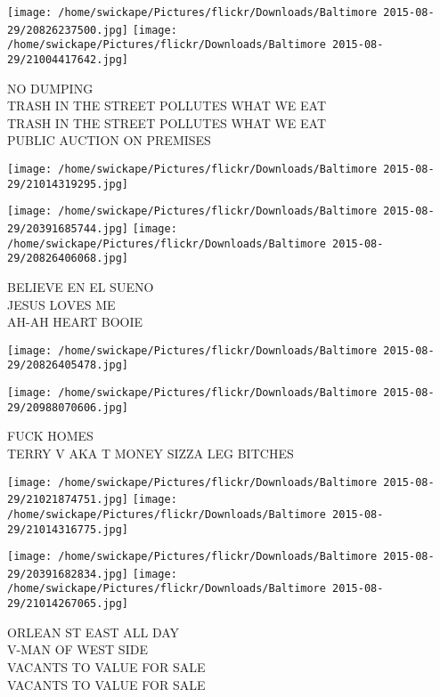 \documentclass[10pt,letterpaper]{article}
\begin{document}
\texttt{[image: /home/swickape/Pictures/flickr/Downloads/Baltimore 2015-08-29/20826237500.jpg]}
\texttt{[image: /home/swickape/Pictures/flickr/Downloads/Baltimore 2015-08-29/21004417642.jpg]}

NO DUMPING\\
TRASH IN THE STREET POLLUTES WHAT WE EAT\\
TRASH IN THE STREET POLLUTES WHAT WE EAT\\
PUBLIC AUCTION ON PREMISES\\
\pagebreak

\texttt{[image: /home/swickape/Pictures/flickr/Downloads/Baltimore 2015-08-29/21014319295.jpg]}

\vspace{0.25in}
\texttt{[image: /home/swickape/Pictures/flickr/Downloads/Baltimore 2015-08-29/20391685744.jpg]}
\texttt{[image: /home/swickape/Pictures/flickr/Downloads/Baltimore 2015-08-29/20826406068.jpg]}

BELIEVE EN EL SUENO\\
JESUS LOVES ME\\
AH{-}AH HEART BOOIE\\
\pagebreak

\texttt{[image: /home/swickape/Pictures/flickr/Downloads/Baltimore 2015-08-29/20826405478.jpg]}

\vspace{0.25in}
\texttt{[image: /home/swickape/Pictures/flickr/Downloads/Baltimore 2015-08-29/20988070606.jpg]}

FUCK HOMES\\
TERRY V AKA T MONEY SIZZA LEG BITCHES\\
\pagebreak

\texttt{[image: /home/swickape/Pictures/flickr/Downloads/Baltimore 2015-08-29/21021874751.jpg]}
\texttt{[image: /home/swickape/Pictures/flickr/Downloads/Baltimore 2015-08-29/21014316775.jpg]}

\texttt{[image: /home/swickape/Pictures/flickr/Downloads/Baltimore 2015-08-29/20391682834.jpg]}
\texttt{[image: /home/swickape/Pictures/flickr/Downloads/Baltimore 2015-08-29/21014267065.jpg]}

ORLEAN ST EAST ALL DAY\\
V{-}MAN OF WEST SIDE\\
VACANTS TO VALUE FOR SALE\\
VACANTS TO VALUE FOR SALE\\
\pagebreak
\end{document}
